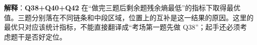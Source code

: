 \textbf{解释}：\textbf{Q38+Q40+Q42} 在“做完三题后剩余题残余熵最低”的指标下取得最优值。三题分别落在不同链条和中段区域，位置上的互补是这一结果的原因。这里的最优只对应该统计指标，不能直接翻译成“考场第一题先做 Q38”；起手还必须考虑题干是否好定位。